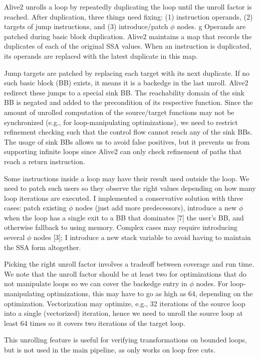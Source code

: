Alive2 unrolls a loop by repeatedly duplicating the loop until the
unroll factor is reached. After duplication, three things need fixing:
%
(1) instruction operands,
%
(2) targets of jump instructions, and
%
(3) introduce/patch $\phi$ nodes.
g
Operands are patched during basic block duplication. Alive2 maintains
a map that records the duplicates of each of the original SSA values.
When an instruction is duplicated, its operands are replaced with the
latest duplicate in this map.

Jump targets are patched by replacing each target with its next
duplicate. If no such basic block (BB) exists, it means it is a
backedge in the last unroll. Alive2 redirect these jumps to a special
sink BB.
%
The reachability domain of the sink BB is negated and added to the
precondition of its respective function.
%
Since the amount of unrolled computation of the source/target
functions may not be synchronized (e.g., for loop-manipulating
optimizations), we need to restrict refinement checking such that the
control flow cannot reach any of the sink BBs.
%
The usage of sink BBs allows us to avoid false positives, but it
prevents us from supporting infinite loops since Alive2 can only check
refinement of paths that reach a return instruction.

Some instructions inside a loop may have their result used outside the
loop. We need to patch such users so they observe the right values
depending on how many loop iterations are executed.
%
I implemented a conservative solution with three cases: patch existing
$\phi$ nodes (just add more predecessors), introduce a new $\phi$ when
the loop has a single exit to a BB that dominates [7] the user’s BB,
and otherwise fallback to using memory.
%
Complex cases may require introducing several $\phi$ nodes [3]; I
introduce a new stack variable to avoid having to maintain the SSA
form altogether.


Picking the right unroll factor involves a tradeoff between coverage
and run time.
%
We note that the unroll factor should be at least two for
optimizations that do not manipulate loops so we can cover the
backedge entry in $\phi$ nodes.
%
For loop-manipulating optimizations, this may have to go as high as
64, depending on the optimization.
%
Vectorization may optimize, e.g., 32 iterations of the source loop
into a single (vectorized) iteration, hence we need to unroll the
source loop at least 64 times so it covers two iterations of the
target loop.

This unrolling feature is useful for verifying transformations on
bounded loops, but is not used in the main \minotaur{} pipeline, as
\minotaur{} only works on loop free cuts.